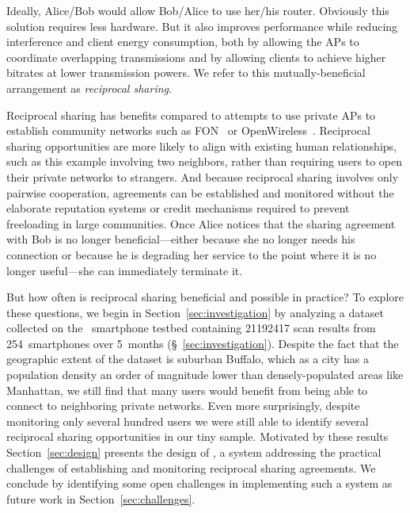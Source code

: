 Ideally, Alice/Bob would allow Bob/Alice to use her/his router. Obviously
this solution requires less hardware. But it also improves performance while
reducing interference and client energy consumption, both by allowing the APs
to coordinate overlapping transmissions and by allowing clients to achieve
higher bitrates at lower transmission powers. We refer to this
mutually-beneficial arrangement as \textit{reciprocal \wifi{} sharing}.

Reciprocal \wifi{} sharing has benefits compared to attempts to use private
APs to establish community networks such as FON~\cite{fon} or
OpenWireless~\cite{openwireless}. Reciprocal \wifi{} sharing opportunities
are more likely to align with existing human relationships, such as this
example involving two neighbors, rather than requiring users to open their
private networks to strangers. And because reciprocal \wifi{} sharing
involves only pairwise cooperation, agreements can be established and
monitored without the elaborate reputation systems or credit mechanisms
required to prevent freeloading in large communities. Once Alice notices that
the sharing agreement with Bob is no longer beneficial---either because she
no longer needs his connection or because he is degrading her service to the
point where it is no longer useful---she can immediately terminate it.

But how often is reciprocal \wifi{} sharing beneficial and possible in
practice? To explore these questions, we begin in
Section~\ref{sec:investigation} by analyzing a dataset collected on the
\PhoneLab{}~smartphone testbed containing \num{21192417} \wifi{} scan results
from 254~smartphones over 5~months (\S~\ref{sec:investigation}). Despite the
fact that the geographic extent of the dataset is suburban Buffalo, which as
a city has a population density an order of magnitude lower than
densely-populated areas like Manhattan, we still find that many users would
benefit from being able to connect to neighboring private networks. Even more
surprisingly, despite monitoring only several hundred users we were still
able to identify several reciprocal \wifi{} sharing opportunities in our tiny
sample. Motivated by these results Section~\ref{sec:design} presents the
design of \wisefi{}, a system addressing the practical challenges of
establishing and monitoring reciprocal \wifi{} sharing agreements. We
conclude by identifying some open challenges in implementing such a system as
future work in Section~\ref{sec:challenges}.
